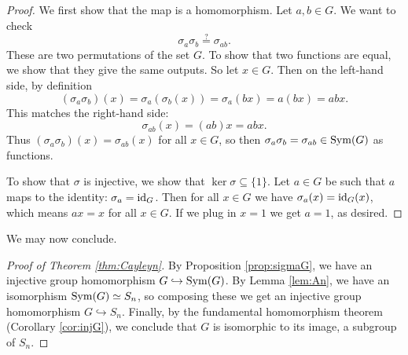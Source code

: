 \documentclass[11pt, reqno]{amsart}
\begin{document}
\begin{proof}
We first show that the map is a homomorphism.  Let $a,b \in G$.  We want to check
\[ \sigma_a \sigma_b \overset{?}{=} \sigma_{ab}. \]
These are two permutations of the set $G$.  To show that two functions are equal, we show that 
they give the same outputs.  So let $x \in G$.  Then on the left-hand side, by definition
\[ (\sigma_a \sigma_b)(x) = \sigma_a(\sigma_b(x)) = \sigma_a(bx) = a(bx) = abx. \]
This matches the right-hand side:
\[ \sigma_{ab}(x)=(ab)x = abx. \]
Thus $(\sigma_a\sigma_b)(x)=\sigma_{ab}(x)$ for all $x \in G$, so then $\sigma_a \sigma_b = 
\sigma_{ab} \in \operatorname{Sym}(G)$ as functions.  

To show that $\sigma$ is injective, we show that $\ker \sigma \subseteq \{1\}$.  Let $a \in G$ 
be such that $a$ maps to the identity: $\sigma_a=\operatorname{id}_G$.  Then for all $x \in G$ we have 
$\sigma_a(x)=\operatorname{id}_G(x)$, which means $ax=x$ for all $x \in G$.  If we plug in $x=1$ we get 
$a=1$, as desired.
\end{proof}

We may now conclude.

\begin{proof}[Proof of Theorem \ref{thm:Cayleyn}]
By Proposition \ref{prop:sigmaG}, we have an injective group homomorphism
$G \hookrightarrow \operatorname{Sym}(G)$. 
By Lemma \ref{lem:An}, we have an isomorphism $\operatorname{Sym}(G) \simeq S_n$, so composing 
these we get an injective group homomorphism $G \hookrightarrow S_n$.  Finally, by the 
fundamental homomorphism theorem (Corollary 
\ref{cor:injG}), we conclude that $G$ is isomorphic to its image, a subgroup of $S_n$.  
\end{proof}


\printbibliography
\end{document}
